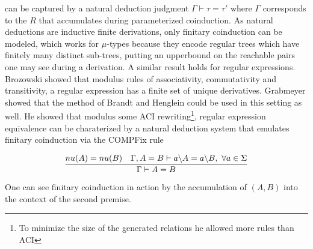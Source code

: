 \documentclass[a4paper,UKenglish,cleveref, autoref, thm-restate]{lipics-v2021}
\begin{document}
can be captured by a natural deduction judgment $\Gamma \vdash \tau = \tau' $ where $\Gamma$ corresponds to the $R$ that accumulates during parameterized coinduction. As natural deductions are inductive finite derivations, only finitary coinduction can be modeled, which works for $\mu$-types because they encode regular trees which have finitely many distinct sub-trees, putting an upperbound on the reachable pairs one may see during a derivation. A similar result holds for regular expressions.\\
 Brozowski showed that modulus rules of associativity, commutativity and transitivity, a regular expression has a finite set of unique derivatives. Grabmeyer showed that the method of Brandt and Henglein could be used in this setting as well. He showed that modulus some ACI rewriting\footnote{To minimize the size of the generated relations he allowed more rules than ACI}, regular expression equivalence can be charaterized by a natural deduction system that emulates finitary coinduction via the COMPFix rule
\begin{definition}
\[\infer{\Gamma \vdash A =  B}{\mynu{A} =  \mynu{B} & \Gamma, A = B \vdash \derive{a}{A} = \derive{a}{B},~\forall a \in \Sigma}\] 
\end{definition}
One can see finitary coinduction in action by the accumulation of $(A,B)$ into the context of the second premise.

\end{document}
